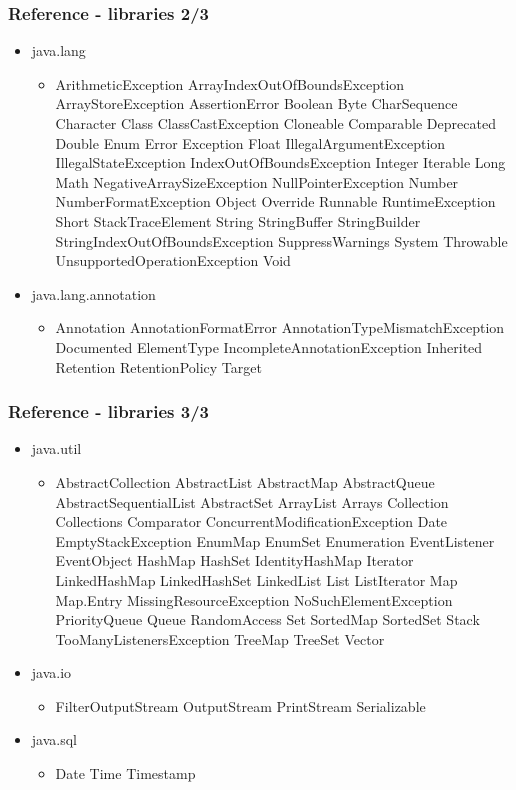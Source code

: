 \begin{frame}
\frametitle{Reference - libraries 2/3}

\begin{itemize}
	\item java.lang
	\begin{itemize}
	\tiny
		\item ArithmeticException
		ArrayIndexOutOfBoundsException
		ArrayStoreException
		AssertionError
		Boolean
		Byte
		CharSequence
		Character
		Class
		ClassCastException
		Cloneable
		Comparable
		Deprecated
		Double
		Enum
		Error
		Exception
		Float
		IllegalArgumentException
		IllegalStateException
		IndexOutOfBoundsException
		Integer
		Iterable
		Long
		Math
		NegativeArraySizeException
		NullPointerException
		Number
		NumberFormatException
		Object
		Override
		Runnable
		RuntimeException
		Short
		StackTraceElement
		String
		StringBuffer
		StringBuilder
		StringIndexOutOfBoundsException
		SuppressWarnings
		System
		Throwable
		UnsupportedOperationException
		Void
\end{itemize}
	\item java.lang.annotation
	\begin{itemize}
	\tiny
		\item Annotation
		AnnotationFormatError
		AnnotationTypeMismatchException
		Documented
		ElementType
		IncompleteAnnotationException
		Inherited
		Retention
		RetentionPolicy
		Target
	\end{itemize}
\end{itemize}
\end{frame}

\begin{frame}
\frametitle{Reference - libraries 3/3}

\begin{itemize}
	\item java.util
	\begin{itemize}
	\tiny
		\item AbstractCollection
		AbstractList
		AbstractMap
		AbstractQueue
		AbstractSequentialList
		AbstractSet
		ArrayList
		Arrays
		Collection
		Collections
		Comparator
		ConcurrentModificationException
		Date
		EmptyStackException
		EnumMap
		EnumSet
		Enumeration
		EventListener
		EventObject
		HashMap
		HashSet
		IdentityHashMap
		Iterator
		LinkedHashMap
		LinkedHashSet
		LinkedList
		List
		ListIterator
		Map
		Map.Entry
		MissingResourceException
		NoSuchElementException
		PriorityQueue
		Queue
		RandomAccess
		Set
		SortedMap
		SortedSet
		Stack
		TooManyListenersException
		TreeMap
		TreeSet
		Vector
	\end{itemize}
	\item java.io
	\begin{itemize}
	\tiny
		\item FilterOutputStream
		OutputStream
		PrintStream
		Serializable
	\end{itemize}
	\item java.sql
	\begin{itemize}
	\tiny
		\item Date
		Time
		Timestamp
	\end{itemize}
\end{itemize}
\end{frame}


